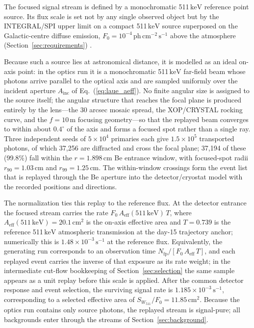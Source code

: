 \documentclass[11pt]{article}
\newcommand{\keV}{\ensuremath{\,\mathrm{keV}}}
\newcommand{\phcms}{\ensuremath{\,\mathrm{ph\,cm^{-2}\,s^{-1}}}}
\newcommand{\cps}{\ensuremath{\,\mathrm{s^{-1}}}}
\newcommand{\wii}{W_{511}}
\newcommand{\aeff}{A_{\mathrm{eff}}}
\newcommand{\fzero}{F_{0}}
\begin{document}
The focused signal stream is defined by a monochromatic 511\keV{} reference
point source. Its flux scale is set not by any single observed object but by the
INTEGRAL/SPI upper limit on a compact 511\keV{} source superposed on the
Galactic-centre diffuse emission, $\fzero=10^{-4}\phcms$ above the atmosphere
(Section~\ref{sec:requirements}) \cite{Siegert2016AA,DeCesare2011}.

Because such a source lies at astronomical distance, it is modelled as an ideal
on-axis point: in the optics run it is a monochromatic 511\keV{} far-field beam
whose photons arrive parallel to the optical axis and are sampled uniformly over
the incident aperture $A_{\mathrm{inc}}$ of Eq.~(\ref{eq:laue_aeff}). No finite
angular size is assigned to the source itself; the angular structure that reaches
the focal plane is produced entirely by the lens---the 30 arcsec mosaic spread,
the XOP/CRYSTAL rocking curve, and the $f=10\,\mathrm{m}$ focusing geometry---so
that the replayed beam converges to within about $0.4^\circ$ of the axis and
forms a focused spot rather than a single ray. Three independent seeds of
$5\times10^{4}$ primaries each give $1.5\times10^{5}$ transported photons, of
which 37,256 are diffracted and cross the focal plane; 37,194 of these (99.8\%)
fall within the $r=1.898\,\mathrm{cm}$ Be entrance window, with focused-spot
radii $r_{90}=1.03\,\mathrm{cm}$ and $r_{99}=1.25\,\mathrm{cm}$. The
within-window crossings form the event list that is replayed through the Be
aperture into the detector/cryostat model with the recorded positions and
directions.

The normalization ties this replay to the reference flux. At the detector
entrance the focused stream carries the rate $\fzero\,\aeff(511\keV)\,T$, where
$\aeff(511\keV)=20.1\,\mathrm{cm^2}$ is the on-axis effective area and $T=0.739$
is the reference 511\keV{} atmospheric transmission at the day-15 trajectory
anchor; numerically this is $1.48\times10^{-3}\cps$ at the reference flux.
Equivalently, the generating run corresponds to an observation time
$N_{\mathrm{fp}}/[\fzero\,\aeff\,T]$, and each replayed event carries the inverse
of that exposure as its rate weight; in the intermediate cut-flow bookkeeping of
Section~\ref{sec:selection} the same sample appears as a unit replay before this
scale is applied. After the common detector response and event selection, the
surviving signal rate is $1.185\times10^{-3}\cps$, corresponding to a selected
effective area of $S_{\wii}/\fzero=11.85\,\mathrm{cm^2}$. Because the optics run
contains only source photons, the replayed stream is signal-pure; all
backgrounds enter through the streams of Section~\ref{sec:background}.
\end{document}
